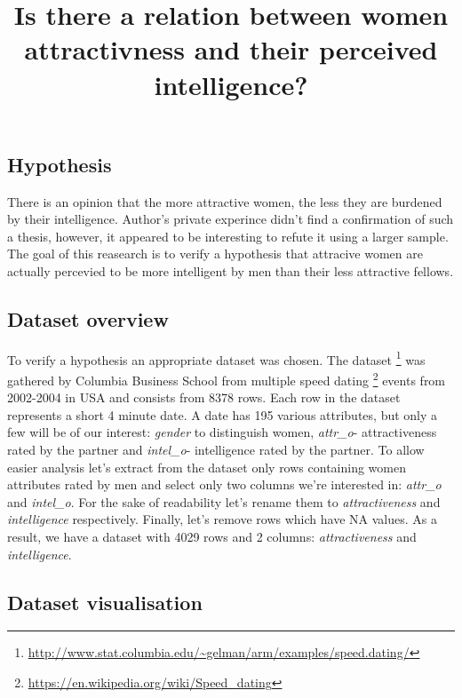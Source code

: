\documentclass[]{article}
\title{Is there a relation between women attractivness and their perceived
intelligence?}
\author{}
\date{}
\let\rmarkdownfootnote\footnote%
\def\footnote{\protect\rmarkdownfootnote}
\begin{document}
\maketitle

{
\setcounter{tocdepth}{2}
\tableofcontents
}
\subsection{Hypothesis}\label{hypothesis}

There is an opinion that the more attractive women, the less they are
burdened by their intelligence. Author's private experince didn't find a
confirmation of such a thesis, however, it appeared to be interesting to
refute it using a larger sample. The goal of this reasearch is to verify
a hypothesis that attracive women are actually percevied to be more
intelligent by men than their less attractive fellows.

\subsection{Dataset overview}\label{dataset-overview}

To verify a hypothesis an appropriate dataset was chosen. The dataset
\footnote{\url{http://www.stat.columbia.edu/~gelman/arm/examples/speed.dating/}}
was gathered by Columbia Business School from multiple speed dating
\footnote{\url{https://en.wikipedia.org/wiki/Speed_dating}} events from
2002-2004 in USA and consists from 8378 rows. Each row in the dataset
represents a short 4 minute date. A date has 195 various attributes, but
only a few will be of our interest: \emph{gender} to distinguish women,
\emph{attr\_o}- attractiveness rated by the partner and \emph{intel\_o}-
intelligence rated by the partner. To allow easier analysis let's
extract from the dataset only rows containing women attributes rated by
men and select only two columns we're interested in: \emph{attr\_o} and
\emph{intel\_o}. For the sake of readability let's rename them to
\emph{attractiveness} and \emph{intelligence} respectively. Finally,
let's remove rows which have NA values. As a result, we have a dataset
with 4029 rows and 2 columns: \emph{attractiveness} and
\emph{intelligence}.

\subsection{Dataset visualisation}\label{dataset-visualisation}
\end{document}
